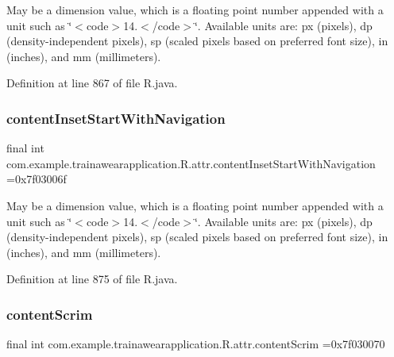 May be a dimension value, which is a floating point number appended with a unit such as \char`\"{}$<$code$>$14.\+5sp$<$/code$>$\char`\"{}. Available units are\+: px (pixels), dp (density-\/independent pixels), sp (scaled pixels based on preferred font size), in (inches), and mm (millimeters). 

Definition at line 867 of file R.\+java.

\mbox{\label{classcom_1_1example_1_1trainawearapplication_1_1_r_1_1attr_a90f3d3350051a6756ef81d61dc1bd6ad}} 
\subsubsection{\texorpdfstring{contentInsetStartWithNavigation}{contentInsetStartWithNavigation}}
{\footnotesize\ttfamily final int com.\+example.\+trainawearapplication.\+R.\+attr.\+content\+Inset\+Start\+With\+Navigation =0x7f03006f\hspace{0.3cm}{\ttfamily [static]}}

May be a dimension value, which is a floating point number appended with a unit such as \char`\"{}$<$code$>$14.\+5sp$<$/code$>$\char`\"{}. Available units are\+: px (pixels), dp (density-\/independent pixels), sp (scaled pixels based on preferred font size), in (inches), and mm (millimeters). 

Definition at line 875 of file R.\+java.

\mbox{\label{classcom_1_1example_1_1trainawearapplication_1_1_r_1_1attr_a2d27644a908d59ead447e90f71fc0028}} 
\subsubsection{\texorpdfstring{contentScrim}{contentScrim}}
{\footnotesize\ttfamily final int com.\+example.\+trainawearapplication.\+R.\+attr.\+content\+Scrim =0x7f030070\hspace{0.3cm}{\ttfamily [static]}}

